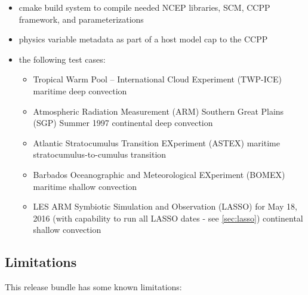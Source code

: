 \begin{itemize}
\item cmake build system to compile needed NCEP libraries, SCM, CCPP framework, and parameterizations
\item physics variable metadata as part of a host model cap to the CCPP
\item the following test cases:
\begin{itemize}
\item Tropical Warm Pool -- International Cloud Experiment (TWP-ICE) maritime deep convection
\item Atmospheric Radiation Measurement (ARM) Southern Great Plains (SGP) Summer 1997 continental deep convection
\item Atlantic Stratocumulus Transition EXperiment (ASTEX) maritime stratocumulus-to-cumulus transition
\item Barbados Oceanographic and Meteorological EXperiment (BOMEX) maritime shallow convection
\item LES ARM Symbiotic Simulation and Observation (LASSO) for May 18, 2016 (with capability to run all LASSO dates - see \ref{sec:lasso}) continental shallow convection
\end{itemize}
\end{itemize}

\subsection{Limitations}

This release bundle has some known limitations:

